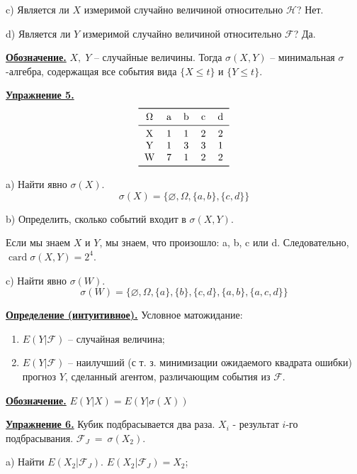 \documentclass[a4paper]{article}
\DeclareMathOperator{\card}{\mathop{card}}
\begin{document}
\par c) Является ли $X$ измеримой случайно величиной относительно $\mathcal{H}$? Нет.\\
\par d) Является ли $Y$ измеримой случайно величиной относительно $\mathcal{F}$? Да.\\
 \par {\bf\underline{Обозначение.}} $X,\;Y$ -- случайные величины. Тогда $\sigma(X,Y)$ -- минимальная $\sigma$-алгебра, содержащая все события вида $\{X\leq t\}$ и $\{Y\leq t\}$.\\
\par {\bf\underline{Упражнение 5.}}
\[\begin{tabular}{*{5}{c}}
\toprule
$\Omega$&a&b&c&d\\
\midrule
X&1&1&2&2\\
Y&1&3&3&1\\
W&7&1&2&2\\
\bottomrule
\end{tabular}\]
\par a) Найти явно $\sigma(X)$. \[\sigma(X)=\{\varnothing,\Omega,\{a,b\},\{c,d\}\}\]
\par b) Определить, сколько событий входит в $\sigma(X,Y)$.
\par Если мы знаем $X$ и $Y$, мы знаем, что произошло: a, b, c или d. Следовательно, $\card \sigma(X,Y)=2^4$.\\
\par c) Найти явно $\sigma(W)$. \[\sigma(W)=\{\varnothing,\Omega,\{a\},\{b\},\{c,d\},\{a,b\},\{a,c,d\}\}\]
\par {\bf\underline{Определение (интуитивное).}} Условное матожидание:
\begin{enumerate}
\item $E(Y|\mathcal{F})$ -- случайная величина;
\item $E(Y|\mathcal{F})$ -- наилучший (с т. з. минимизации ожидаемого квадрата ошибки) прогноз $Y$, сделанный агентом, различающим события из $\mathcal{F}$.
\end{enumerate}
 \par {\bf\underline{Обозначение.}} $E(Y|X)=E(Y|\sigma(X))$\\
\par {\bf\underline{Упражнение 6.}}  Кубик подбрасывается два раза. $X_i$ - результат $i$-го подбрасывания. $\mathcal{F}_J~=~\sigma(X_2)$.\\
\par a) Найти $E(X_2|\mathcal{F}_J)$. $E(X_2|\mathcal{F}_J)=X_2$;\\
\end{document}
